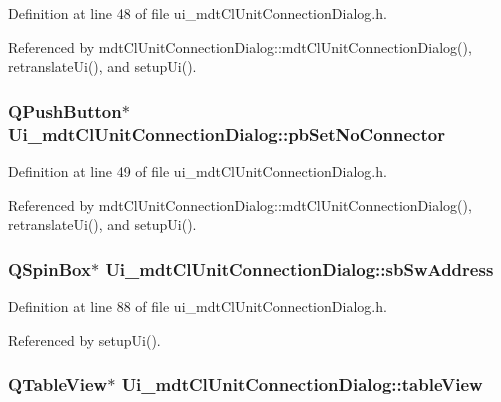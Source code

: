 Definition at line 48 of file ui\-\_\-mdt\-Cl\-Unit\-Connection\-Dialog.\-h.



Referenced by mdt\-Cl\-Unit\-Connection\-Dialog\-::mdt\-Cl\-Unit\-Connection\-Dialog(), retranslate\-Ui(), and setup\-Ui().

\hypertarget{class_ui__mdt_cl_unit_connection_dialog_a6aed879ab8292d13e82f8d563ff38200}{
\subsubsection[{pb\-Set\-No\-Connector}]{\setlength{\rightskip}{0pt plus 5cm}Q\-Push\-Button$\ast$ Ui\-\_\-mdt\-Cl\-Unit\-Connection\-Dialog\-::pb\-Set\-No\-Connector}}\label{class_ui__mdt_cl_unit_connection_dialog_a6aed879ab8292d13e82f8d563ff38200}


Definition at line 49 of file ui\-\_\-mdt\-Cl\-Unit\-Connection\-Dialog.\-h.



Referenced by mdt\-Cl\-Unit\-Connection\-Dialog\-::mdt\-Cl\-Unit\-Connection\-Dialog(), retranslate\-Ui(), and setup\-Ui().

\hypertarget{class_ui__mdt_cl_unit_connection_dialog_a33b682b708350ffd121c3fd8f3b00cc4}{
\subsubsection[{sb\-Sw\-Address}]{\setlength{\rightskip}{0pt plus 5cm}Q\-Spin\-Box$\ast$ Ui\-\_\-mdt\-Cl\-Unit\-Connection\-Dialog\-::sb\-Sw\-Address}}\label{class_ui__mdt_cl_unit_connection_dialog_a33b682b708350ffd121c3fd8f3b00cc4}


Definition at line 88 of file ui\-\_\-mdt\-Cl\-Unit\-Connection\-Dialog.\-h.



Referenced by setup\-Ui().

\hypertarget{class_ui__mdt_cl_unit_connection_dialog_a5c7cd5489aef36dfc84df7976a778628}{
\subsubsection[{table\-View}]{\setlength{\rightskip}{0pt plus 5cm}Q\-Table\-View$\ast$ Ui\-\_\-mdt\-Cl\-Unit\-Connection\-Dialog\-::table\-View}}\label{class_ui__mdt_cl_unit_connection_dialog_a5c7cd5489aef36dfc84df7976a778628}



